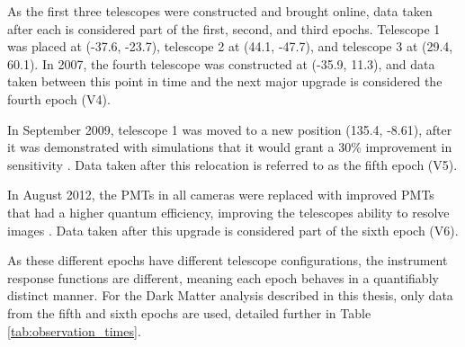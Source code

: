 As the first three telescopes were constructed and brought online, data taken after each is considered part of the first, second, and third epochs.
Telescope 1 was placed at (-37.6, -23.7), telescope 2 at (44.1, -47.7), and telescope 3 at (29.4, 60.1).
In 2007, the fourth telescope was constructed at (-35.9, 11.3), and data taken between this point in time and the next major upgrade is considered the fourth epoch (V4).

In September 2009, telescope 1 was moved to a new position (135.4, -8.61), after it was demonstrated with simulations that it would grant a \nicetilde{}30\% improvement in sensitivity \cite{veritas_t1_move}.
Data taken after this relocation is referred to as the fifth epoch (V5).

In August 2012, the PMTs in all cameras were replaced with improved PMTs that had a higher quantum efficiency, improving the telescopes ability to resolve images \cite{pmtmodels}.
Data taken after this upgrade is considered part of the sixth epoch (V6).

As these different epochs have different telescope configurations, the instrument response functions are different, meaning each epoch behaves in a quantifiably distinct manner.
For the Dark Matter analysis described in this thesis, only data from the fifth and sixth epochs are used, detailed further in Table \ref{tab:observation_times}.


